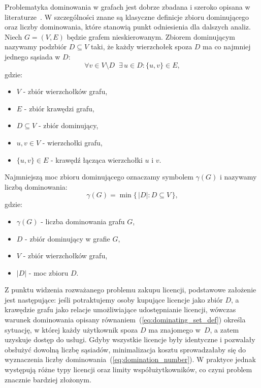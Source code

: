 Problematyka dominowania w grafach jest dobrze zbadana i szeroko opisana w literaturze~\cite{haynes1998domination}.
W szczególności znane są klasyczne definicje zbioru dominującego oraz liczby dominowania, które stanowią punkt odniesienia dla dalszych analiz.
Niech $G=(V,E)$ będzie grafem nieskierowanym.
Zbiorem dominującym nazywamy podzbiór $D \subseteq V$ taki, że każdy wierzchołek spoza $D$ ma co najmniej jednego sąsiada w $D$:
\begin{equation}
  \forall v \in V \setminus D \;\; \exists\, u \in D : \{u,v\} \in E ,
  \label{eq:dominating_set_def}
\end{equation}
gdzie:
\begin{itemize}
  \item $V$ - zbiór wierzchołków grafu,
  \item $E$ - zbiór krawędzi grafu,
  \item $D \subseteq V$ - zbiór dominujący,
  \item $u,v \in V$ - wierzchołki grafu,
  \item $\{u,v\}\in E$ - krawędź łącząca wierzchołki $u$ i $v$.
\end{itemize}


Najmniejszą moc zbioru dominującego oznaczamy symbolem $\gamma(G)$ i nazywamy liczbą dominowania:
\begin{equation}
  \gamma(G) = \min \{\, |D| : D \subseteq V \,\},
  \label{eq:domination_number}
\end{equation}
gdzie:
\begin{itemize}
  \item $\gamma(G)$ - liczba dominowania grafu $G$,
  \item $D$ - zbiór dominujący w grafie $G$,
  \item $V$ - zbiór wierzchołków grafu,
  \item $|D|$ - moc zbioru $D$.
\end{itemize}



Z punktu widzenia rozważanego problemu zakupu licencji, podstawowe założenie jest następujące:
jeśli potraktujemy osoby kupujące licencje jako zbiór \(D\), a krawędzie grafu jako relacje
umożliwiające udostępnianie licencji, wówczas warunek dominowania opisany równaniem~(\ref{eq:dominating_set_def}) określa sytuację,
w której każdy użytkownik spoza $D$ ma znajomego w~$D$, a zatem uzyskuje dostęp do usługi.
Gdyby wszystkie licencje były identyczne i pozwalały obsłużyć dowolną liczbę sąsiadów,
minimalizacja kosztu sprowadzałaby się do wyznaczenia liczby dominowania~(\ref{eq:domination_number}).
W praktyce jednak występują różne typy licencji oraz limity
współużytkowników, co czyni problem znacznie bardziej złożonym.

